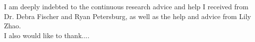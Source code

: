 \newpage
\thispagestyle{empty} %
\addtocounter{page}{-1} %
\begin{flushright}
\vspace*{\fill}
I am deeply indebted to the continuous research advice and help I received from Dr. Debra Fischer and Ryan Petersburg, as well as the help and advice from Lily Zhao.
\\
I also would like to thank....
\vspace*{\fill}
\end{flushright}
